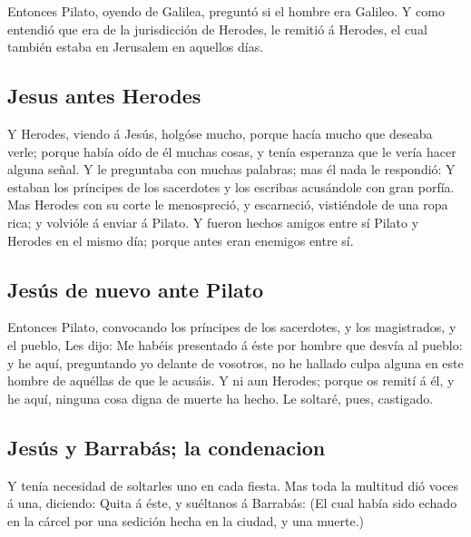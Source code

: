  Entonces Pilato, oyendo de Galilea, preguntó si el hombre
era Galileo.  Y como entendió que era de la jurisdicción
de Herodes, le remitió á Herodes, el cual también estaba en Jerusalem en
aquellos días.

\hypertarget{jesus-antes-herodes}{%
\subsection{Jesus antes Herodes}\label{jesus-antes-herodes}}

 Y Herodes, viendo á Jesús, holgóse mucho, porque hacía
mucho que deseaba verle; porque había oído de él muchas cosas, y tenía
esperanza que le vería hacer alguna señal.  Y le
preguntaba con muchas palabras; mas él nada le respondió:
 Y estaban los príncipes de los sacerdotes y los escribas
acusándole con gran porfía.  Mas Herodes con su corte le
menospreció, y escarneció, vistiéndole de una ropa rica; y volvióle á
enviar á Pilato.  Y fueron hechos amigos entre sí Pilato
y Herodes en el mismo día; porque antes eran enemigos entre sí.

\hypertarget{jesuxfas-de-nuevo-ante-pilato}{%
\subsection{Jesús de nuevo ante
Pilato}\label{jesuxfas-de-nuevo-ante-pilato}}

 Entonces Pilato, convocando los príncipes de los
sacerdotes, y los magistrados, y el pueblo,  Les dijo: Me
habéis presentado á éste por hombre que desvía al pueblo: y he aquí,
preguntando yo delante de vosotros, no he hallado culpa alguna en este
hombre de aquéllas de que le acusáis.  Y ni aun Herodes;
porque os remití á él, y he aquí, ninguna cosa digna de muerte ha hecho.
 Le soltaré, pues, castigado.

\hypertarget{jesuxfas-y-barrabuxe1s-la-condenacion}{%
\subsection{Jesús y Barrabás; la
condenacion}\label{jesuxfas-y-barrabuxe1s-la-condenacion}}

 Y tenía necesidad de soltarles uno en cada fiesta.
 Mas toda la multitud dió voces á una, diciendo: Quita á
éste, y suéltanos á Barrabás:  (El cual había sido echado
en la cárcel por una sedición hecha en la ciudad, y una muerte.)

